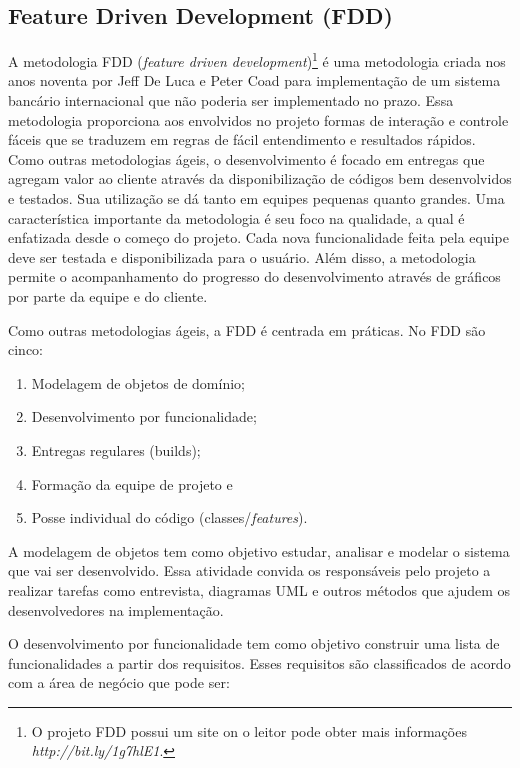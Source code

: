 \subsection{Feature Driven Development (FDD)}

A metodologia FDD (\textit{feature driven development})\footnote{O projeto FDD possui um site on o leitor pode obter mais informações \textit{http://bit.ly/1g7hlE1}.} é uma metodologia criada nos anos noventa por Jeff De Luca e Peter Coad para implementação de um sistema bancário internacional que não poderia ser implementado no prazo. Essa metodologia proporciona aos envolvidos no projeto formas de interação e controle fáceis que se traduzem em regras de fácil entendimento e resultados rápidos. Como outras metodologias ágeis, o desenvolvimento é focado em entregas que agregam valor ao cliente através da disponibilização de códigos bem desenvolvidos e testados. Sua utilização se dá tanto em equipes pequenas quanto grandes. Uma característica importante da metodologia é seu foco na qualidade, a qual é enfatizada desde o começo do projeto. Cada nova funcionalidade feita pela equipe deve ser testada e disponibilizada para o usuário. Além disso, a metodologia permite o acompanhamento do progresso do desenvolvimento através de gráficos por parte da equipe e do cliente. \cite{macedo:12}

Como outras metodologias ágeis, a FDD é centrada em práticas. No FDD são cinco:

\begin{enumerate}
	\item Modelagem de objetos de domínio;
	\item Desenvolvimento por funcionalidade;
	\item Entregas regulares (builds);
	\item Formação da equipe de projeto e
	\item Posse individual do código (classes/\textit{features}).
\end{enumerate}

A modelagem de objetos tem como objetivo estudar, analisar e modelar o sistema que vai ser desenvolvido. Essa atividade convida os responsáveis pelo projeto a realizar tarefas como entrevista, diagramas UML e outros métodos que ajudem os desenvolvedores na implementação. \cite{macedo:12}

O desenvolvimento por funcionalidade tem como objetivo construir uma lista de funcionalidades a partir dos requisitos. Esses requisitos são classificados de acordo com a área de negócio que pode ser:

